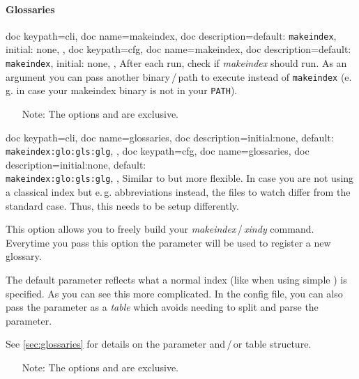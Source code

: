 \documentclass[a4paper, 11pt]{scrartcl}
\newcommand\eg{e.\,g.\xspace}
\begin{document}
\paragraph{Glossaries}
\begin{docKeys}[
		doc parameter={=\meta{makeindex}},
	]{
		{
			doc keypath=cli,
			doc name=makeindex,
			doc description={default: \texttt{makeindex}, initial: none},
		},
		{
			doc keypath=cfg,
			doc name=makeindex,
			doc description={default: \texttt{makeindex}, initial: none},
		},
	}
	After each run, check if \emph{makeindex} should run.
	As an argument  you can pass another binary\,/\,path to execute instead of \texttt{makeindex} (\eg in case your makeindex binary is not in your \texttt{PATH}).

	\begin{itemize}
		\item[Note:] The options  and  are exclusive.
	\end{itemize}
\end{docKeys}
\begin{docKeys}[
		doc parameter={=\meta{glossaries}},
	]{
		{
			doc keypath=cli,
			doc name=glossaries,
			doc description={initial:none, default: \\\texttt{makeindex:glo:gls:glg}},
		},
		{
			doc keypath=cfg,
			doc name=glossaries,
			doc description={initial:none, default: \\\texttt{makeindex:glo:gls:glg}},
		},
	}
	Similar to  but more flexible.
	In case you are not using a classical index but \eg abbreviations instead, the files to watch differ from the standard case.
	Thus, this needs to be setup differently.

	This option allows you to freely build your \emph{makeindex}\,/\,\emph{xindy} command.
	Everytime you pass this option the parameter will be used to register a new glossary.

	The default parameter reflects what a normal index (like when using simple ) is specified.
	As you can see this more complicated. In the config file, you can also pass the parameter as a \emph{table} which avoids needing to split and parse the parameter.

	See \cref{sec:glossaries} for details on the parameter and\,/\,or table structure.

	\begin{itemize}
		\item[Note:] The options  and  are exclusive.
	\end{itemize}
\end{docKeys}
\end{document}
